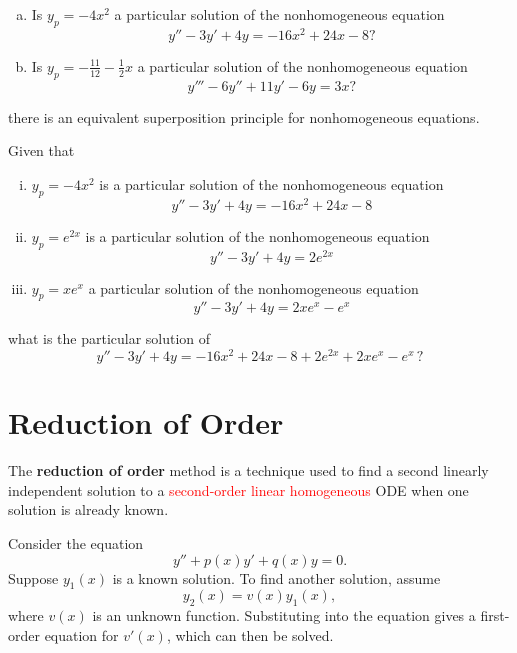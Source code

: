 \begin{example}
  \begin{enumerate}[(a)]
    \item Is \(y_p = -4x^2\) a particular solution of the nonhomogeneous equation \[y'' - 3y' + 4y = -16x^2 + 24x - 8?\]
    \item Is \(y_p = -\frac{11}{12} - \frac{1}{2}x\) a particular solution of the nonhomogeneous equation \[y''' - 6y'' + 11y' -6y= 3x?\]
  \end{enumerate}
\end{example}

\begin{highlight}
   there is an equivalent superposition principle for nonhomogeneous equations.
\end{highlight}


\begin{example}
  Given that 
  \begin{enumerate}[(i)]
    \item \(y_p = -4x^2\) is a particular solution of the nonhomogeneous equation 
        \[y'' - 3y' + 4y = -16x^2 + 24x - 8\]
    \item \(y_p = e^{2x}\) is a particular solution of the nonhomogeneous equation
        \[y'' - 3y' + 4y = 2e^{2x}\]
    \item \(y_p = xe^x\) a particular solution of the nonhomogeneous equation
    \[y'' - 3y' + 4y = 2xe^{x} - e^x\]
  \end{enumerate}
  what is the particular solution of \[y'' - 3y' + 4y = -16x^2 + 24x - 8 + 2e^{2x} + 2xe^{x} - e^x \,?\]
\end{example}





\section{Reduction of Order}
The \textbf{reduction of order} method is a technique used to find a second linearly independent solution to a 
\textcolor{red}{second-order linear homogeneous} ODE when one solution is already known.

Consider the equation
\[
y'' + p(x)y' + q(x)y = 0.
\]
Suppose $y_1(x)$ is a known solution. To find another solution, assume
\[
y_2(x) = v(x)y_1(x),
\]
where $v(x)$ is an unknown function. Substituting into the equation gives a first-order equation for $v'(x)$, which can then be solved.


